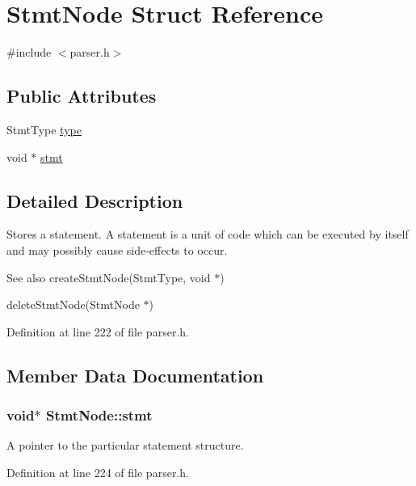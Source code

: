 \hypertarget{struct_stmt_node}{\section{Stmt\-Node Struct Reference}
\label{struct_stmt_node}
}


{\ttfamily \#include $<$parser.\-h$>$}

\subsection*{Public Attributes}
\begin{DoxyCompactItemize}
\item 
Stmt\-Type \hyperlink{struct_stmt_node_a1a1a8ff13773a99c9344f5392cabfa13}{type}
\item 
void $\ast$ \hyperlink{struct_stmt_node_abe2bb8927d8a9a26b83d855fb14837e6}{stmt}
\end{DoxyCompactItemize}


\subsection{Detailed Description}
Stores a statement. A statement is a unit of code which can be executed by itself and may possibly cause side-\/effects to occur.

\begin{DoxySeeAlso}{See also}
create\-Stmt\-Node(\-Stmt\-Type, void $\ast$) 

delete\-Stmt\-Node(\-Stmt\-Node $\ast$) 
\end{DoxySeeAlso}


Definition at line 222 of file parser.\-h.



\subsection{Member Data Documentation}
\hypertarget{struct_stmt_node_abe2bb8927d8a9a26b83d855fb14837e6}{
\subsubsection[{stmt}]{\setlength{\rightskip}{0pt plus 5cm}void$\ast$ {\bf Stmt\-Node\-::stmt}}}\label{struct_stmt_node_abe2bb8927d8a9a26b83d855fb14837e6}
A pointer to the particular statement structure. 

Definition at line 224 of file parser.\-h.

